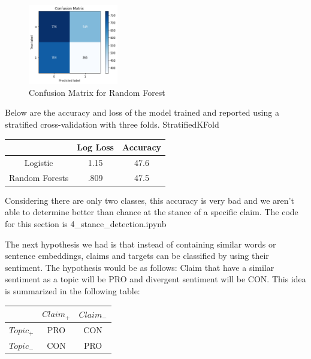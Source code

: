 \documentclass[11pt,a4paper]{article}
\begin{document}
\begin{figure}[H]
    \centering
    \includegraphics[width=0.35\textwidth]{stance_w2v_lr}
    \caption{\label{font-table} Confusion Matrix for Random Forest }
\end{figure} 

Below are the accuracy and loss of the model trained and reported using a stratified cross-validation with three folds.
StratifiedKFold
\begin{table}[H]
\begin{center}
\begin{tabular}{|c|c|c|}
\hline \bf & \bf Log Loss & \bf Accuracy \\ \hline
Logistic & 1.15 & 47.6 \\
Random Forests & .809 & 47.5 \\
\hline
\end{tabular}
\end{center}
\end{table}

Considering there are only two classes, this accuracy is very bad and we aren't able to determine better than chance at the stance of a specific claim.  The code for this section is 4_stance_detection.ipynb

The next hypothesis we had is that instead of containing similar words or sentence embeddings, claims and targets can be classified by using their sentiment.  The hypothesis would be as follows:  Claim that have a similar sentiment as a topic will be PRO and divergent sentiment will be CON.  This idea is summarized in the following table:

\begin{table}[H]
\begin{center}
\begin{tabular}{|c|c|c|}
\hline \bf & \bf $Claim_{+}$ & \bf $Claim_{-}$ \\ \hline
$Topic_{+}$ & PRO & CON \\
$Topic_{-}$ & CON & PRO \\
\hline
\end{tabular}
\end{center}
\end{table}
\end{document}
